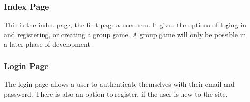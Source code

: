 \subsubsection{Index Page}
\begin{center}
\end{center}
This is the index page, the first page a user sees. It gives the options of loging in and registering, or creating a group game. A group game will only be possible in a later phase of development.

\subsubsection{Login Page}
\begin{center}
\end{center}
The login page allows a user to authenticate themselves with their email and password. There is also an option to register, if the user is new to the site.

